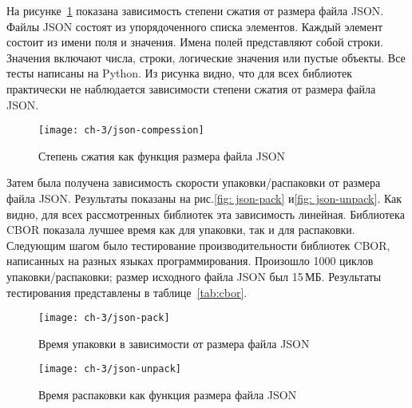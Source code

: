 На рисунке~\cref{fig:json-compress} показана зависимость степени сжатия от размера файла JSON. Файлы JSON состоят из упорядоченного списка элементов. Каждый элемент состоит из имени поля и значения. Имена полей представляют собой строки. Значения включают числа, строки, логические значения или пустые объекты. Все тесты написаны на Python. Из рисунка видно, что для всех библиотек практически не наблюдается зависимости степени сжатия от размера файла JSON.

\begin{figure}[!htb]
	\centering
	\texttt{[image: ch-3/json-compession]}
	\caption{Степень сжатия как функция размера файла JSON}
	\label{fig:json-compress}
\end{figure}


Затем была получена зависимость скорости упаковки/распаковки от размера файла JSON. Результаты показаны на рис.\cref{fig: json-pack} и\cref{fig: json-unpack}. Как видно, для всех рассмотренных библиотек эта зависимость линейная. Библиотека CBOR показала лучшее время как для упаковки, так и для распаковки.
Следующим шагом было тестирование производительности библиотек CBOR, написанных на разных языках программирования. Произошло 1000 циклов упаковки/распаковки; размер исходного файла JSON был 15\,МБ. Результаты тестирования представлены в таблице~\cref{tab:cbor}.

\begin{figure}[!ht]
	\centering
	\texttt{[image: ch-3/json-pack]}
	\caption{Время упаковки в зависимости от размера файла JSON}
	\label{fig:json-pack}
\end{figure}

\begin{figure}[!ht]
	\centering
	\texttt{[image: ch-3/json-unpack]}
	\caption{Время распаковки как функция размера файла JSON}
	\label{fig:json-unpack}
\end{figure}

